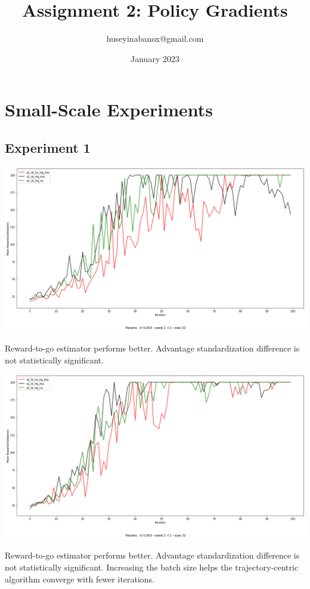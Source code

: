 \documentclass[11pt]{article}
\title{Assignment 2: Policy Gradients}
\author{huseyinabanox@gmail.com}
\date{January 2023}
\begin{document}
    \maketitle

    \section{Small-Scale Experiments}

    \subsection{Experiment 1}

    \includegraphics[scale=0.35]{q1/q1_sb_plot}

    Reward-to-go estimator performs better.
    Advantage standardization difference is not statistically significant.


    \hspace*{-0.5in}
    \includegraphics[scale=0.35]{q1/q1_lb_plot}

    Reward-to-go estimator performs better.
    Advantage standardization difference is not statistically significant.
    Increasing the batch size helps the trajectory-centric algorithm converge with fewer iterations.
\end{document}
